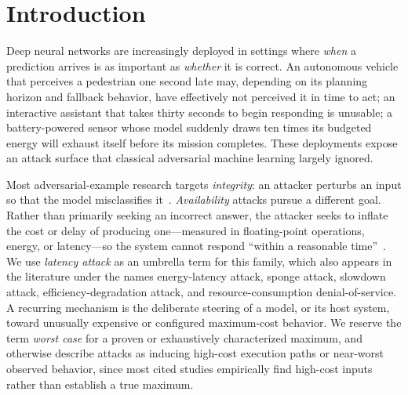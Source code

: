 \documentclass[acmsmall,screen,review,nonacm]{acmart}
\begin{document}

\maketitle
\tableofcontents
\section{Introduction}
\label{sec:intro}

Deep neural networks are increasingly deployed in settings where \emph{when} a prediction arrives is as important as \emph{whether} it is correct. An autonomous vehicle that perceives a pedestrian one second late may, depending on its planning horizon and fallback behavior, have effectively not perceived it in time to act; an interactive assistant that takes thirty seconds to begin responding is unusable; a battery-powered sensor whose model suddenly draws ten times its budgeted energy will exhaust itself before its mission completes. These deployments expose an attack surface that classical adversarial machine learning largely ignored.

Most adversarial-example research targets \emph{integrity}: an attacker perturbs an input so that the model misclassifies it~\cite{vassilev2023nist, gao2026performance}. \emph{Availability} attacks pursue a different goal. Rather than primarily seeking an incorrect answer, the attacker seeks to inflate the cost or delay of producing one---measured in floating-point operations, energy, or latency---so the system cannot respond ``within a reasonable time''~\cite{chen2024overload}. We use \emph{latency attack} as an umbrella term for this family, which also appears in the literature under the names energy-latency attack, sponge attack, slowdown attack, efficiency-degradation attack, and resource-consumption denial-of-service. A recurring mechanism is the deliberate steering of a model, or its host system, toward unusually expensive or configured maximum-cost behavior. We reserve the term \emph{worst case} for a proven or exhaustively characterized maximum, and otherwise describe attacks as inducing high-cost execution paths or near-worst observed behavior, since most cited studies empirically find high-cost inputs rather than establish a true maximum.
\end{document}
